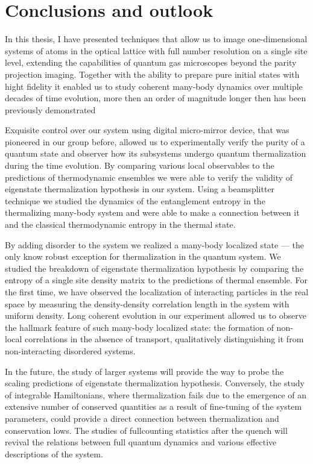 
\chapter{Conclusions and outlook}

In this thesis, I have presented techniques that allow us to image one-dimensional systems of atoms in the optical lattice with full number resolution on a single site level, extending the capabilities of quantum gas microscopes beyond the parity projection imaging. Together with the ability to prepare pure initial states with hight fidelity it enabled us to study coherent many-body dynamics over multiple decades of time evolution, more then an order of magnitude longer then has been previously demonstrated

Exquisite control over our system using digital micro-mirror device, that was pioneered in our group before, allowed us  to experimentally verify the purity of a quantum state and observer how its subsystems undergo quantum thermalization during the time evolution. By comparing various local observables to the predictions of thermodynamic ensembles we were able to verify the validity of eigenstate thermalization hypothesis in our system. Using a beamsplitter technique we studied the dynamics of the entanglement entropy in the thermalizing many-body system and were able to make a connection between it and the classical thermodynamic entropy in the thermal state.

By adding disorder to the system we realized a many-body localized state --- the only know robust exception for thermalization in the quantum system. We studied the breakdown of eigenstate thermalization hypothesis by comparing the entropy of a single site density matrix to the predictions of thermal ensemble. For the first time, we have observed the localization of interacting particles in the real space by measuring the density-density correlation length in the system with uniform density. Long coherent evolution in our experiment allowed us to observe the hallmark feature of such many-body localized state: the formation of non-local correlations in the absence of transport, qualitatively distinguishing it from non-interacting disordered systems.

In the future, the study of larger systems will provide the way to probe the scaling predictions of eigenstate thermalization hypothesis. Conversely, the study of integrable Hamiltonians, where thermalization fails due to the emergence of an extensive number of conserved quantities as a result of fine-tuning of the system parameters, could provide a direct connection between thermalization and conservation lows. The studies of fullcounting statistics after the quench will revival the relations between full quantum dynamics and various effective descriptions of the system.

